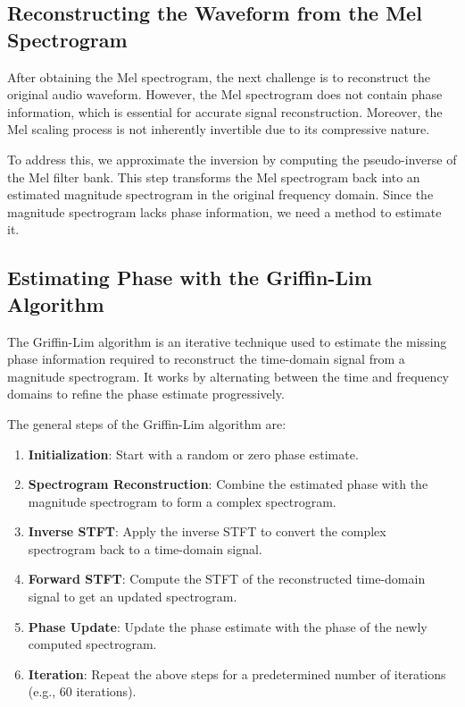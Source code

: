 \documentclass[12pt]{article}
\begin{document}
\subsection{Reconstructing the Waveform from the Mel Spectrogram}

After obtaining the Mel spectrogram, the next challenge is to reconstruct the original audio waveform. However, the Mel spectrogram does not contain phase information, which is essential for accurate signal reconstruction. Moreover, the Mel scaling process is not inherently invertible due to its compressive nature.

To address this, we approximate the inversion by computing the pseudo-inverse of the Mel filter bank. This step transforms the Mel spectrogram back into an estimated magnitude spectrogram in the original frequency domain. Since the magnitude spectrogram lacks phase information, we need a method to estimate it.

\subsection{Estimating Phase with the Griffin-Lim Algorithm}

The Griffin-Lim algorithm is an iterative technique used to estimate the missing phase information required to reconstruct the time-domain signal from a magnitude spectrogram. It works by alternating between the time and frequency domains to refine the phase estimate progressively.

The general steps of the Griffin-Lim algorithm are:

\begin{enumerate}
    \item \textbf{Initialization}: Start with a random or zero phase estimate.
    \item \textbf{Spectrogram Reconstruction}: Combine the estimated phase with the magnitude spectrogram to form a complex spectrogram.
    \item \textbf{Inverse STFT}: Apply the inverse STFT to convert the complex spectrogram back to a time-domain signal.
    \item \textbf{Forward STFT}: Compute the STFT of the reconstructed time-domain signal to get an updated spectrogram.
    \item \textbf{Phase Update}: Update the phase estimate with the phase of the newly computed spectrogram.
    \item \textbf{Iteration}: Repeat the above steps for a predetermined number of iterations (e.g., 60 iterations).
\end{enumerate}
\end{document}
